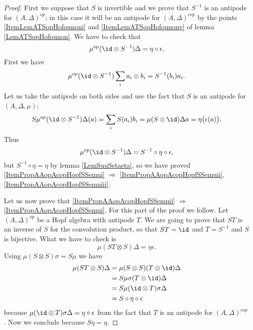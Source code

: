 \begin{proof}
    First we suppose that \( S\) is invertible and we prove that $S^{-1}$ is an antipode for \( (A,\Delta)^{op}\); in this case it will be an antipode for \( (A,\Delta)^{cop}\) by the points \ref{ItemLemATSopHofounoni} and \ref{ItemLemATSopHofounonv} of lemma \ref{LemATSopHofounon}. We have to check that
    \begin{equation}
        \mu^{op}(\id\otimes S^{-1})\Delta=\eta\circ\epsilon.
    \end{equation}
    First we have
    \begin{equation}
        \mu^{op}(\id\otimes S^{-1})\sum_ia_i\otimes b_i=S^{-1}(b_i)a_i.
    \end{equation}
    Let us take the antipode on both sides and use the fact that \( S\) is an antipode for \( (A,\Delta,\mu)\):
    \begin{equation}
        S\mu^{op}(\id\otimes S^{-1})\Delta (a)=\sum_iS(a_i)b_i=\mu(S\otimes \id)\Delta a=\eta\big( \epsilon(a) \big).
    \end{equation}
    Thus 
    \begin{equation}
        \mu^{op}(\id\otimes S^{-1})\Delta=S^{-1}\circ\eta\circ\epsilon,
    \end{equation}
    but \( S^{-1}\circ\eta=\eta\) by lemma \ref{LemSuuSetaeta}, so we have proved \ref{ItemPropAAopAcopHopfSSemui} \( \Rightarrow\) \ref{ItemPropAAopAcopHopfSSemuii},\ref{ItemPropAAopAcopHopfSSemuiii}.

    Let us now prove that \ref{ItemPropAAopAcopHopfSSemuii} \( \Rightarrow\) \ref{ItemPropAAopAcopHopfSSemui}. For this part of the proof we follow\cite{RolandVertignioux}. Let \( (A,\Delta)^{op}\) be a Hopf algebra with antipode \( T\). We are going to prove that \( ST\) is an inverse of \( S\) for the convolution product, so that \( ST=\id\) and \( T=S^{-1}\) and \( S\) is bijective. What we have to check is
    \begin{equation}
        \mu(ST\otimes S)\Delta=\eta\epsilon.
    \end{equation}
    Using \( \mu(S\otimes S)\sigma=S\mu\) we have
    \begin{equation}
        \begin{aligned}[]
            \mu(ST\otimes S)\Delta&=\mu(S\otimes S)(T\otimes \id)\Delta\\
            &=S\mu\sigma(T\otimes \id)\Delta\\
            &=S\mu(\id\otimes T)\sigma\Delta\\
            &=S\circ\eta\circ\epsilon
        \end{aligned}
    \end{equation}
    because \( \mu(\id\otimes T)\sigma\Delta=\eta\circ\epsilon\) from the fact that \( T\) is an antipode for \( (A,\Delta)^{cop}\). Now we conclude because \( S\eta=\eta\).
\end{proof}

